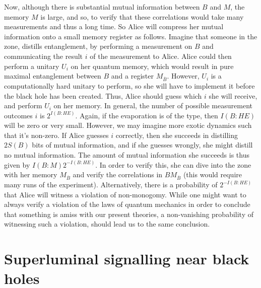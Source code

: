 \documentclass[11pt,a4paper]{article}
\begin{document}
Now, although there is substantial mutual information between $B$ and $M$, the memory $M$ is large, and so, to verify that these correlations would take many measurements and thus a long time. So 
Alice will compress her mutual information onto a small memory register as follows. Imagine that someone in the zone, distills entanglement, by performing a measurement on $B$ and communicating the result $i$ of the measurement to Alice. Alice could then
perform a unitary $U_i$ on her quantum memory, which would result in pure maximal entanglement between $B$ and a register $M_{\overline{B}}$. However, $U_i$ is a computationally hard unitary to perform, so she will have to implement it before the black hole has been created. Thus, Alice should guess which $i$ she will receive, and perform $U_i$ on her memory. In general, the number of possible measurement outcomes $i$ is $2^{I(B:HE)}$\cite{devetak2005distillation}. Again, if the evaporation is of the  \cite{bhlock,HaydenPreskill,sekino2008fast}  type, then $I(B:HE)$ will be zero or very small. However, we may imagine more exotic dynamics such that it's non-zero. If Alice guesses $i$ correctly, then she succeeds in distilling $ 2S(B)$ bits of mutual information, and if she guesses wrongly, she might distill no mutual information. The amount of mutual information she succeeds is thus given by $I(B:M)2^{-I(B:HE)}$. In order to verify this, she can dive into the zone with her memory $M_{\overline{B}}$ and verify the correlations in $BM_{\overline{B}}$ (this would require many runs of the experiment). Alternatively, there is a 
probability of $2^{-I(B:HE)}$ that Alice will witness a violation of non-monogomy. While one might want to always verify  a violation of the laws of quantum mechanics 
in order to conclude that
something is amiss with our present theories, a non-vanishing probability of witnessing such a violation, should lead us to the same conclusion.
 
\section{Superluminal signalling near black holes}
\label{sec:chsh}
\end{document}
